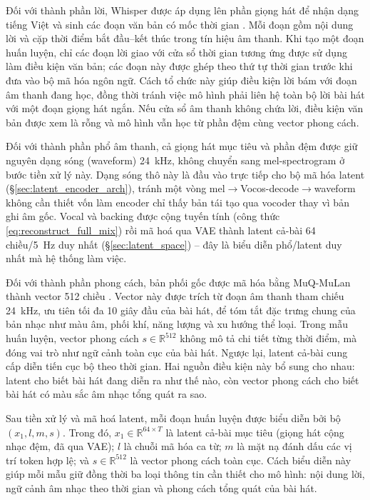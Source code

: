 \documentclass[a4paper,13pt,oneside]{report}
\begin{document}
Đối với thành phần lời, Whisper \cite{whisper} được áp dụng lên phần giọng hát để nhận dạng tiếng Việt và sinh các đoạn văn bản có mốc thời gian . Mỗi đoạn gồm nội dung lời và cặp thời điểm bắt đầu--kết thúc trong tín hiệu âm thanh. Khi tạo một đoạn huấn luyện, chỉ các đoạn lời giao với cửa sổ thời gian tương ứng được sử dụng làm điều kiện văn bản; các đoạn này được ghép theo thứ tự thời gian trước khi đưa vào bộ mã hóa ngôn ngữ. Cách tổ chức này giúp điều kiện lời bám với đoạn âm thanh đang học, đồng thời tránh việc mô hình phải liên hệ toàn bộ lời bài hát với một đoạn giọng hát ngắn. Nếu cửa sổ âm thanh không chứa lời, điều kiện văn bản được xem là rỗng và mô hình vẫn học từ phần đệm cùng vector phong cách.

Đối với thành phần phổ âm thanh, cả giọng hát mục tiêu và phần đệm được giữ nguyên dạng sóng (waveform) 24~kHz, không chuyển sang mel-spectrogram ở bước tiền xử lý này. Dạng sóng thô này là đầu vào trực tiếp cho bộ mã hóa latent (\S\ref{sec:latent_encoder_arch}), tránh một vòng mel$\to$Vocos-decode$\to$waveform không cần thiết vốn làm encoder chỉ thấy bản tái tạo qua vocoder thay vì bản ghi âm gốc. Vocal và backing được cộng tuyến tính (công thức \eqref{eq:reconstruct_full_mix}) rồi mã hoá qua VAE thành latent cả-bài 64 chiều/5~Hz duy nhất (\S\ref{sec:latent_space}) -- đây là biểu diễn phổ/latent duy nhất mà hệ thống làm việc.

Đối với thành phần phong cách, bản phối gốc được mã hóa bằng MuQ-MuLan thành
vector 512 chiều \cite{muq}. Vector này được trích từ đoạn âm thanh tham chiếu
24~kHz, ưu tiên tối đa 10 giây đầu của bài hát, để tóm tắt đặc trưng chung của
bản nhạc như màu âm, phối khí, năng lượng và xu hướng thể loại. Trong mẫu huấn
luyện, vector phong cách $s\in\mathbb{R}^{512}$ không mô tả chi tiết từng thời
điểm, mà đóng vai trò như ngữ cảnh toàn cục của bài hát. Ngược lại, latent cả-bài
cung cấp diễn tiến cục bộ theo thời gian. Hai nguồn điều kiện này bổ sung cho
nhau: latent cho biết bài hát đang diễn ra như thế nào, còn vector phong cách
cho biết bài hát có màu sắc âm nhạc tổng quát ra sao.

Sau tiền xử lý và mã hoá latent, mỗi đoạn huấn luyện được biểu diễn bởi bộ $(x_1,l,m,s)$.
Trong đó, $x_1\in\mathbb{R}^{64\times T}$ là latent cả-bài mục tiêu (giọng hát cộng nhạc
đệm, đã qua VAE); $l$ là chuỗi mã hóa ca từ; $m$ là mặt nạ đánh dấu các vị
trí token hợp lệ; và $s\in\mathbb{R}^{512}$ là vector phong cách toàn cục. Cách
biểu diễn này giúp mỗi mẫu giữ đồng thời ba loại thông tin cần thiết cho mô hình:
nội dung lời, ngữ cảnh âm nhạc theo thời gian và phong cách tổng quát của bài hát.
\end{document}
